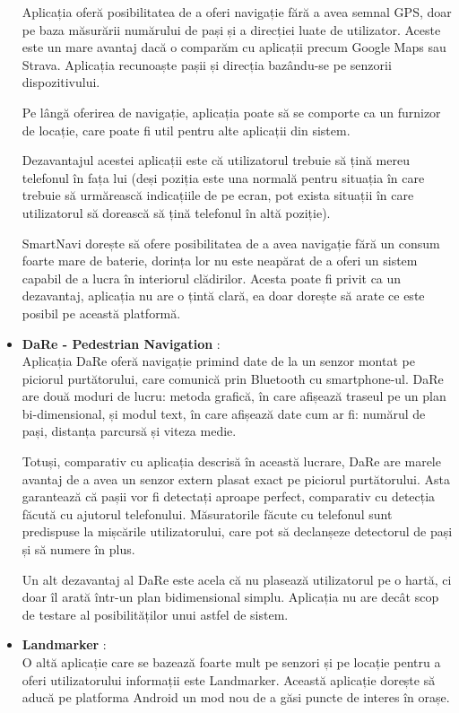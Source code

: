 \documentclass[12pt,a4paper]{article}
\begin{document}
\begin{itemize}
Aplicația oferă posibilitatea de a oferi navigație fără a avea semnal GPS, doar pe baza măsurării numărului de pași și a direcției luate de utilizator. Aceste este un mare avantaj dacă o comparăm cu aplicații precum Google Maps sau Strava. Aplicația recunoaște pașii și direcția bazându-se pe senzorii dispozitivului. 

Pe lângă oferirea de navigație, aplicația poate să se comporte ca un furnizor de locație, care poate fi util pentru alte aplicații din sistem. 

Dezavantajul acestei aplicații este că utilizatorul trebuie să țină mereu telefonul în fața lui (deși poziția este una normală pentru situația în care trebuie să urmărească indicațiile de pe ecran, pot exista situații în care utilizatorul să dorească să țină telefonul în altă poziție).

SmartNavi dorește să ofere posibilitatea de a avea navigație fără un consum foarte mare de baterie, dorința lor nu este neapărat de a oferi un sistem capabil de a lucra în interiorul clădirilor. Acesta poate fi privit ca un dezavantaj, aplicația nu are o țintă clară, ea doar dorește să arate ce este posibil pe această platformă.

\item \textbf{DaRe - Pedestrian Navigation} \cite{DaRe}:\\
Aplicația DaRe oferă navigație primind date de la un senzor montat pe piciorul purtătorului, care comunică prin Bluetooth cu smartphone-ul. DaRe are două moduri de lucru: metoda grafică, în care afișează traseul pe un plan bi-dimensional, și modul text, în care afișează date cum ar fi: numărul de pași, distanța parcursă și viteza medie. 

Totuși, comparativ cu aplicația descrisă în această lucrare, DaRe are marele avantaj de a avea un senzor extern plasat exact pe piciorul purtătorului. Asta garantează că pașii vor fi detectați aproape perfect, comparativ cu detecția făcută cu ajutorul telefonului. Măsuratorile făcute cu telefonul sunt predispuse la mișcările utilizatorului, care pot să declanșeze detectorul de pași și să numere în plus.

Un alt dezavantaj al DaRe este acela că nu plasează utilizatorul pe o hartă, ci doar îl arată într-un plan bidimensional simplu. Aplicația nu are decât scop de testare al posibilităților unui astfel de sistem.

\item \textbf{Landmarker} \cite{Landmarker}:\\
O altă aplicație care se bazează foarte mult pe senzori și pe locație pentru a oferi utilizatorului informații este Landmarker. Această aplicație dorește să aducă pe platforma Android un mod nou de a găsi puncte de interes în orașe. 


\end{itemize}
\end{document}

